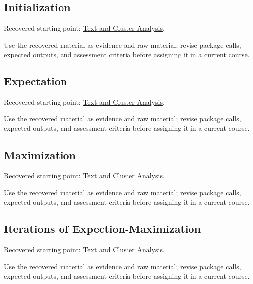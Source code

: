 \documentclass[
  letterpaper,
]{scrbook}
\begin{document}
\subsection*{Initialization}\label{sec-pr-10-initialization}

Recovered starting point: \hyperref[sec-lab-clustering]{Text and Cluster
Analysis}.

Use the recovered material as evidence and raw material; revise package
calls, expected outputs, and assessment criteria before assigning it in
a current course.

\subsection*{Expectation}\label{sec-pr-10-expectation}

Recovered starting point: \hyperref[sec-lab-clustering]{Text and Cluster
Analysis}.

Use the recovered material as evidence and raw material; revise package
calls, expected outputs, and assessment criteria before assigning it in
a current course.

\subsection*{Maximization}\label{sec-pr-10-maximization}

Recovered starting point: \hyperref[sec-lab-clustering]{Text and Cluster
Analysis}.

Use the recovered material as evidence and raw material; revise package
calls, expected outputs, and assessment criteria before assigning it in
a current course.

\subsection*{Iterations of
Expection-Maximization}\label{sec-pr-10-iterations-of-expection-maximization}

Recovered starting point: \hyperref[sec-lab-clustering]{Text and Cluster
Analysis}.

Use the recovered material as evidence and raw material; revise package
calls, expected outputs, and assessment criteria before assigning it in
a current course.
\end{document}
